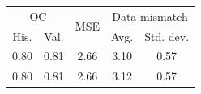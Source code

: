 \begin{tabular}{ccccc}
\toprule
\multicolumn{2}{c}{OC} & 
\multirow{2}{*}{
    MSE
} & 
\multicolumn{2}{c}{Data mismatch} 
\\
His. & Val. &  & Avg. & Std. dev.
\\
\midrule
0.80 & 0.81 & 2.66 & 3.10 & 0.57 \\
0.80 & 0.81 & 2.66 & 3.12 & 0.57 \\
\bottomrule
\end{tabular}
